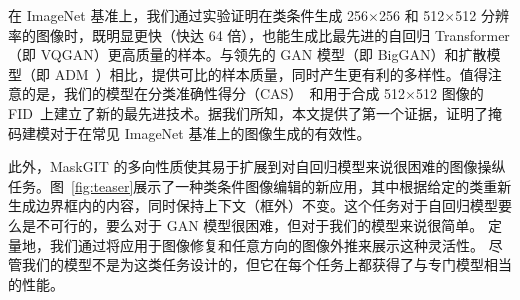 在 ImageNet 基准上，我们通过实验证明\model 在类条件生成 256$\times$256 和 512$\times$512 分辨率的图像时，既明显更快（快达 64 倍），也能生成比最先进的自回归 Transformer（即 VQGAN）更高质量的样本。与领先的 GAN 模型（即 BigGAN）和扩散模型（即 ADM~\cite{dhariwal2021diffusion}）相比，\model 提供可比的样本质量，同时产生更有利的多样性。值得注意的是，我们的模型在分类准确性得分（CAS）~\cite{Ravuri19CAS}和用于合成 512$\times$512 图像的 FID~\cite{FID}上建立了新的最先进技术。据我们所知，本文提供了第一个证据，证明了掩码建模对于在常见 ImageNet 基准上的图像生成的有效性。  

此外，MaskGIT 的多向性质使其易于扩展到对自回归模型来说很困难的图像操纵任务。图~\ref{fig:teaser}展示了一种类条件图像编辑的新应用，其中\model 根据给定的类重新生成边界框内的内容，同时保持上下文（框外）不变。这个任务对于自回归模型要么是不可行的，要么对于 GAN 模型很困难，但对于我们的模型来说很简单。
定量地，我们通过将\model 应用于图像修复和任意方向的图像外推来展示这种灵活性。
尽管我们的模型不是为这类任务设计的，但它在每个任务上都获得了与专门模型相当的性能。

